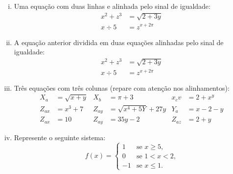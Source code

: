 \documentclass[a4paper, 11pt]{article}
\begin{document}
\begin{enumerate}[i)]
	\item Uma equação com duas linhas e alinhada pelo sinal de igualdade:
		\begin{equation}
			\begin{split}
				x^2 + z ^3 & = \sqrt{2+3y} \\
				  x \div 5 & = z^{x+2\pi}
			\end{split}
		\end{equation}

	\item A equação anterior dividida em duas equações alinhadas pelo sinal de igualdade:
			\begin{align}
				x^2 + z ^3 & = \sqrt{2+3y} \\
				x \div 5 & = z^{x+2\pi}
			\end{align}
	
	\item Três equações com três colunas (repare com atenção nos alinhamentos):
		\begin{align}
			X_{a}  & =\sqrt{x+y} & X_{b}  & = \pi + 3                 & x_{c}v & = 2 + x^{y} \\
			Z_{ax} & =x^{3} + 7  & Z_{ay} & = \sqrt{x^{4} + 5Y} + 27y & Y_{a}  & = x - 2 - y \\
			Z_{ax} & = 10        & Z_{ay} & = 35y - 2                 & Z_{az} & = 2 + y
		\end{align}

	\item Represente o seguinte sistema:
	\begin{equation}
		f(x)=
		\begin{cases}
			1 & \text{se } x \geq 5 \text{,} \\
			0 & \text{se } 1 < x < 2 \text{,} \\
			-1 & \text{se } x \leq  1 \text{.}
		\end{cases}
	\end{equation}
\end{enumerate}
\end{document}
